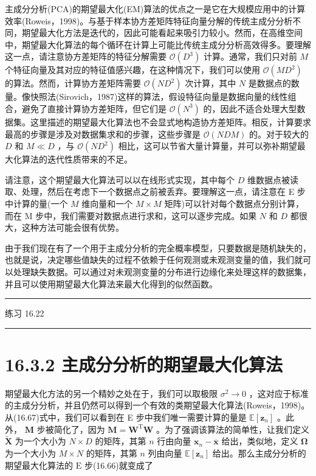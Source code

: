 \documentclass[10pt]{article}
\newcommand{\HRule}{\begin{center}\rule{0.9\linewidth}{0.2mm}\end{center}}
\begin{document}
主成分分析(PCA)的期望最大化(EM)算法的优点之一是它在大规模应用中的计算效率(Roweis，1998)。与基于样本协方差矩阵特征向量分解的传统主成分分析不同，期望最大化方法是迭代的，因此可能看起来吸引力较小。然而，在高维空间中，期望最大化算法的每个循环在计算上可能比传统主成分分析高效得多。要理解这一点，请注意协方差矩阵的特征分解需要 \(\mathcal{O}\left( {D}^{3}\right)\) 计算。通常，我们只对前 \(M\) 个特征向量及其对应的特征值感兴趣，在这种情况下，我们可以使用 \(\mathcal{O}\left( {M{D}^{2}}\right)\) 的算法。然而，计算协方差矩阵需要 \(\mathcal{O}\left( {N{D}^{2}}\right)\) 次计算，其中 \(N\) 是数据点的数量。像快照法(Sirovich，1987)这样的算法，假设特征向量是数据向量的线性组合，避免了直接计算协方差矩阵，但它们是 \(\mathcal{O}\left( {N}^{3}\right)\) 的，因此不适合处理大型数据集。这里描述的期望最大化算法也不会显式地构造协方差矩阵。相反，计算要求最高的步骤是涉及对数据集求和的步骤，这些步骤是 \(\mathcal{O}\left( {NDM}\right)\) 的。对于较大的 \(D\) 和 \(M \ll  D\) ，与 \(\mathcal{O}\left( {N{D}^{2}}\right)\) 相比，这可以节省大量计算量，并可以弥补期望最大化算法的迭代性质带来的不足。

请注意，这个期望最大化算法可以以在线形式实现，其中每个 \(D\) 维数据点被读取、处理，然后在考虑下一个数据点之前被丢弃。要理解这一点，请注意在 E 步中计算的量(一个 \(M\) 维向量和一个 \(M \times  M\) 矩阵)可以针对每个数据点分别计算，而在 M 步中，我们需要对数据点进行求和，这可以逐步完成。如果 \(N\) 和 \(D\) 都很大，这种方法可能会很有优势。

由于我们现在有了一个用于主成分分析的完全概率模型，只要数据是随机缺失的，也就是说，决定哪些值缺失的过程不依赖于任何观测或未观测变量的值，我们就可以处理缺失数据。可以通过对未观测变量的分布进行边缘化来处理这样的数据集，并且可以使用期望最大化算法来最大化得到的似然函数。

\HRule

练习 16.22

\HRule

\section*{16.3.2 主成分分析的期望最大化算法}

期望最大化方法的另一个精妙之处在于，我们可以取极限 \({\sigma }^{2} \rightarrow  0\) ，这对应于标准的主成分分析，并且仍然可以得到一个有效的类期望最大化算法(Roweis，1998)。从(16.67)式中，我们可以看到在 E 步中我们唯一需要计算的量是 \(\mathbb{E}\left\lbrack  {\mathbf{z}}_{n}\right\rbrack\) 。此外， \(\mathbf{M}\) 步被简化了，因为 \(\mathbf{M} = {\mathbf{W}}^{\mathrm{T}}\mathbf{W}\) 。为了强调该算法的简单性，让我们定义 \(\widetilde{\mathbf{X}}\) 为一个大小为 \(N \times  D\) 的矩阵，其第 \(n\) 行由向量 \({\mathbf{x}}_{n} - \overline{\mathbf{x}}\) 给出，类似地，定义 \(\mathbf{\Omega }\) 为一个大小为 \(M \times  N\) 的矩阵，其第 \(n\) 列由向量 \(\mathbb{E}\left\lbrack  {\mathbf{z}}_{n}\right\rbrack\) 给出。那么主成分分析的期望最大化算法的 \(\mathrm{E}\) 步(16.66)就变成了
\end{document}
